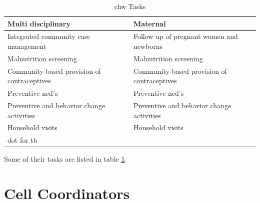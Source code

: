 \begin{table}
\centering
\begin{tabular}{|p{5cm}|p{5cm}|}
\hline
\textbf{Multi disciplinary} & \textbf{Maternal} \\
\hline
Integrated community case management & Follow up of pregnant women and newborns \\
\hline
Malnutrition screening & Malnutrition screening \\
\hline
Community-based provision of contraceptives & Community-based provision of contraceptives \\
\hline
Preventive \gls{ncd}'s & Preventive \gls{ncd}'s \\
\hline
Preventive and behavior change activities & Preventive and behavior change activities \\
\hline
Household visits & Household visits \\
\hline
\gls{dot} for \gls{tb} & \\
\hline
\end{tabular}
\caption{\gls{chw} Tasks}
\label{table:chwtasks}
\end{table}

Some of their tasks are listed in table \ref{table:chwtasks}.

\cite{chd:strategy}

\section{Cell Coordinators}

